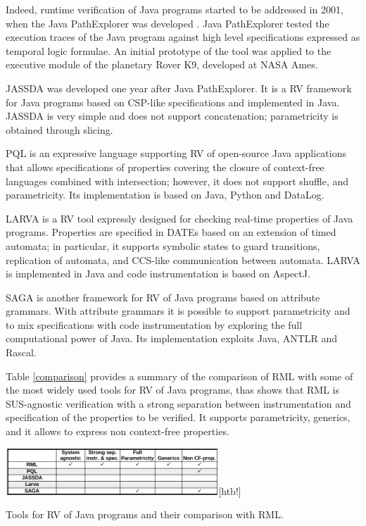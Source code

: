 Indeed, runtime verification of Java programs started to be addressed in 2001, when the Java PathExplorer was developed \cite{havelund2001java}. Java PathExplorer tested the execution traces of the Java program against high level specifications expressed as temporal logic formulae. An initial prototype of the tool was applied to the executive module of the planetary Rover K9, developed at NASA Ames. 

JASSDA \cite{BrorkensM02} was developed one year after Java PathExplorer. It is a RV framework for Java programs
based on CSP-like specifications and implemented in Java. JASSDA is very simple and does not support concatenation; parametricity
is obtained through slicing. 

PQL \cite{MartinLL05}  is an expressive language supporting RV of open-source Java
applications that allows specifications of properties covering the closure of context-free languages combined with intersection;
however, it does not support shuffle, and parametricity.  Its implementation is based on Java, Python and DataLog. 


LARVA \cite{ColomboPS09} is a RV tool expressly designed for checking real-time properties of Java programs.
Properties are specified in DATEs \cite{DATEs}
based on an extension of timed automata; in particular, it supports
symbolic states to guard transitions, replication of automata, and 
CCS-like communication between automata. LARVA is implemented in Java and code instrumentation is based on AspectJ.

SAGA  \cite{BoerGouw14} is another framework for RV of Java programs
based on attribute grammars. With attribute grammars it is possible to support parametricity and to mix specifications
with code instrumentation by exploring the full computational power of Java. Its implementation exploits Java, ANTLR and Rascal.

Table \ref{comparison} provides a summary of the comparison of RML with some of the most widely used tools for RV of Java programs, thas shows that 
RML is SUS-agnostic verification with a strong separation between instrumentation and specification of the properties to be verified. It supports parametricity, generics, and it allows to express non context-free properties. 

\begin{table}
    \includegraphics[width=0.6\textwidth,keepaspectratio=true]{tabella-viv3.jpg}[htb!]
\caption{Tools for RV of Java programs and their comparison with RML.}
\label{comparison}
\end{table}
